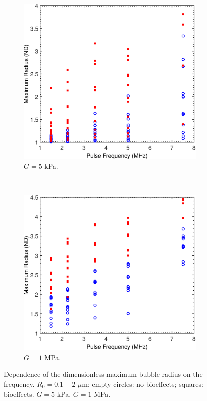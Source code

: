 \begin{figure}[t]
  \begin{subfigure}{0.47\textwidth}
    \includegraphics[width=\textwidth]{figs/bubble_figs/Rstarmax_F_Ca=20}
    \caption{$G=5$ kPa.}
  \label{fig:freq_tissue_Ca20}
  \end{subfigure}
  ~
  \begin{subfigure}{0.47\textwidth}
    \includegraphics[width=\textwidth]{figs/bubble_figs/Rstarmax_F_Ca=0,1}
    \caption{$G=1$ MPa.}
    \label{fig:freq_tissue_Ca0,1}
  \end{subfigure}
  \caption[Dependence of the maximum bubble radius on frequency and
  elasticity]{Dependence of the dimensionless maximum bubble radius on
    the frequency. $R_0=0.1-2$ $\mu$m; empty circles: no bioeffects;
    squares: bioeffects.  $G=5$
    kPa.  $G=1$ MPa.}
  \label{fig:freq_tissue}
\end{figure}

